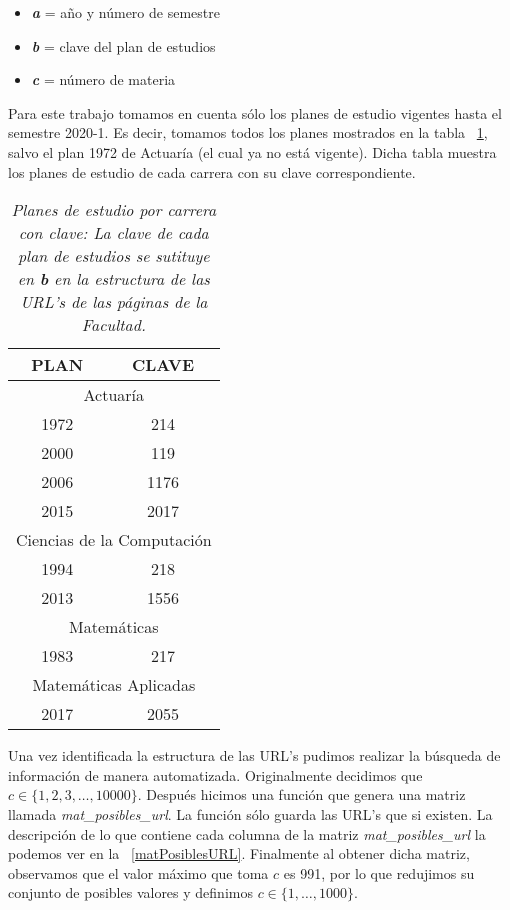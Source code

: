 \begin{itemize}
\item[ ] \textit{\textbf{a}} = año y número de semestre

\item[ ] \textit{\textbf{b}} = clave del plan de estudios

\item[ ] \textit{\textbf{c}} = número de materia
\end{itemize}

Para este trabajo tomamos en cuenta sólo los planes de estudio vigentes hasta el semestre 2020-1. Es decir, tomamos todos los planes mostrados en la tabla \tablename{~\ref{PlanesEstudio}}, salvo el plan 1972 de Actuaría (el cual ya no está vigente). Dicha tabla muestra los planes de estudio de cada carrera con su clave correspondiente.

\begin{table}[h]
\centering
\begin{tabular}{|c|c|}
 \hline 
  \textbf{PLAN} & \textbf{CLAVE} \\ 
 \hline 
 \multicolumn{2}{|c|}{Actuaría} \\ 
 \hline 
 1972 & 214 \\ 
 \hline 
 2000 & 119 \\ 
 \hline 
 2006 & 1176 \\ 
 \hline 
 2015 & 2017 \\ 
 \hline 
 \multicolumn{2}{|c|}{Ciencias de la Computación} \\ 
 \hline 
 1994 & 218 \\ 
 \hline 
 2013 & 1556 \\ 
 \hline 
 \multicolumn{2}{|c|}{Matemáticas} \\ 
 \hline 
 1983 & 217 \\ 
 \hline 
 \multicolumn{2}{|c|}{Matemáticas Aplicadas} \\ 
 \hline 
 2017 & 2055 \\ 
 \hline 
 \end{tabular}
\caption[\textit{Planes de estudio por carrera con clave}]{\textit{Planes de estudio por carrera con clave: La clave de cada plan de estudios se sutituye en \textbf{b} en la estructura de las URL's de las páginas de la Facultad.}}\label{PlanesEstudio}
\end{table}

Una vez identificada la estructura de las URL's pudimos realizar la búsqueda de información de manera automatizada. Originalmente decidimos que $c \in \{1,2,3, \ldots, 10 000\}$. Después hicimos una función que genera una matriz llamada \textit{mat\_posibles\_url}. La función sólo guarda las URL's que si existen. La descripción de lo que contiene cada columna de la matriz \textit{mat\_posibles\_url} la podemos ver en la \tablename{~\ref{matPosiblesURL}}. Finalmente al obtener dicha matriz, observamos que el valor máximo que toma $c$ es 991, por lo que redujimos su conjunto de posibles valores y definimos $c \in \{1, \ldots, 1 000\}$.


